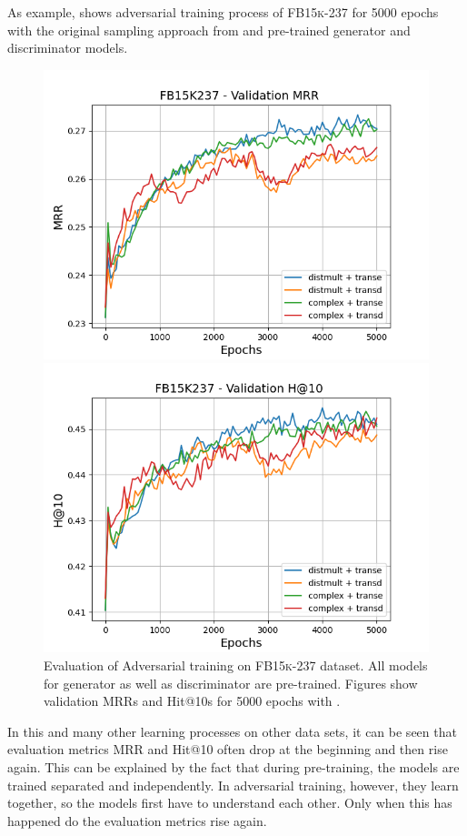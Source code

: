 As example,  shows adversarial training process of \textsc{FB15k-237} for 5000 epochs with the original sampling approach from \kbgan and pre-trained  generator and discriminator models.
\begin{figure}[H]
    \centering
    \begin{minipage}{.5\textwidth}
      \centering
      \includegraphics[width=0.9\linewidth]{figures/results/gan_train/pretrained/random/fb15k237/gan_train_random_fb15k237_mrrs.png}
    \end{minipage}%
    \begin{minipage}{.5\textwidth}
      \centering
      \includegraphics[width=0.9\linewidth]{figures/results/gan_train/pretrained/random/fb15k237/gan_train_random_fb15k237_hit10s.png}
    \end{minipage}
    \caption{Evaluation of Adversarial training on \textsc{FB15k-237} dataset.
    All models for generator as well as discriminator are pre-trained.
    Figures show validation MRRs and Hit@10s for 5000 epochs with \origsampling.}
    \label{fig:original_pretrained_advtrain}
\end{figure}
In this and many other learning processes on other data sets, it can be seen that evaluation metrics MRR and Hit@10 often drop at the beginning and then rise again.
This can be explained by the fact that during pre-training, the models are trained separated and independently.
In adversarial training, however, they learn together, so the models first have to understand each other.
Only when this has happened do the evaluation metrics rise again.

